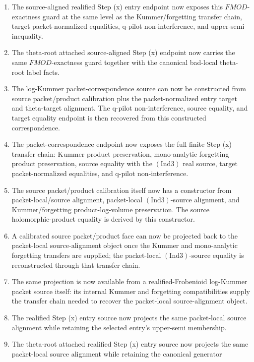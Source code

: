 \documentclass[11pt]{article}
\newcommand{\Ind}{\ensuremath{\mathrm{Ind}}}
\theoremstyle{plain}
\theoremstyle{definition}
\theoremstyle{remark}
\begin{document}
\begin{enumerate}
  normalization, \((\Ind3)\)-source equality, and upper-semi inequality used in
  that construction.
\item The source-aligned realified Step (x) entry endpoint now exposes this
  \(FMOD\)-exactness guard at the same level as the Kummer/forgetting transfer
  chain, target packet-normalized equalities, q-pilot non-interference, and
  upper-semi inequality.
\item The theta-root attached source-aligned Step (x) endpoint now carries the
  same \(FMOD\)-exactness guard together with the canonical bad-local
  theta-root label facts.
\item The log-Kummer packet-correspondence source can now be constructed from
  source packet/product calibration plus the packet-normalized entry target and
  theta-target alignment.  The q-pilot non-interference, source equality, and
  target equality endpoint is then recovered from this constructed
  correspondence.
\item The packet-correspondence endpoint now exposes the full finite Step (x)
  transfer chain: Kummer product preservation, mono-analytic forgetting product
  preservation, source equality with the \((\Ind3)\) real source, target
  packet-normalized equalities, and q-pilot non-interference.
\item The source packet/product calibration itself now has a constructor from
  packet-local/source alignment, packet-local \((\Ind3)\)-source alignment,
  and Kummer/forgetting product-log-volume preservation.  The source
  holomorphic-product equality is derived by this constructor.
\item A calibrated source packet/product face can now be projected back to the
  packet-local source-alignment object once the Kummer and mono-analytic
  forgetting transfers are supplied; the packet-local \((\Ind3)\)-source
  equality is reconstructed through that transfer chain.
\item The same projection is now available from a realified-Frobenioid
  log-Kummer packet source itself: its internal Kummer and forgetting
  compatibilities supply the transfer chain needed to recover the packet-local
  source-alignment object.
\item The realified Step (x) entry source now projects the same packet-local
  source alignment while retaining the selected entry's upper-semi membership.
\item The theta-root attached realified Step (x) entry source now projects the
  same packet-local source alignment while retaining the canonical generator

\end{enumerate}
\end{document}
